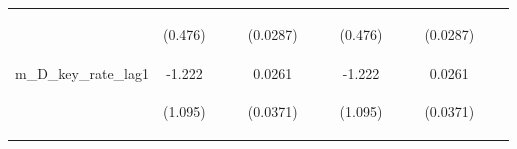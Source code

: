 \documentclass[]{article}
\begin{document}
\begin{center}
\begin{tabular}{lcccccccccccc}
\vspace{4pt} & \begin{footnotesize}(0.476)\end{footnotesize} & \begin{footnotesize}\end{footnotesize} & \begin{footnotesize}\end{footnotesize} & \begin{footnotesize}(0.0287)\end{footnotesize} & \begin{footnotesize}\end{footnotesize} & \begin{footnotesize}\end{footnotesize} & \begin{footnotesize}(0.476)\end{footnotesize} & \begin{footnotesize}\end{footnotesize} & \begin{footnotesize}\end{footnotesize} & \begin{footnotesize}(0.0287)\end{footnotesize} & \begin{footnotesize}\end{footnotesize} & \begin{footnotesize}\end{footnotesize} \\
m\_D\_key\_rate\_lag1 & -1.222 &  &  & 0.0261 &  &  & -1.222 &  &  & 0.0261 &  &  \\
\vspace{4pt} & \begin{footnotesize}(1.095)\end{footnotesize} & \begin{footnotesize}\end{footnotesize} & \begin{footnotesize}\end{footnotesize} & \begin{footnotesize}(0.0371)\end{footnotesize} & \begin{footnotesize}\end{footnotesize} & \begin{footnotesize}\end{footnotesize} & \begin{footnotesize}(1.095)\end{footnotesize} & \begin{footnotesize}\end{footnotesize} & \begin{footnotesize}\end{footnotesize} & \begin{footnotesize}(0.0371)\end{footnotesize} & \begin{footnotesize}\end{footnotesize} & \begin{footnotesize}\end{footnotesize} \\

\end{tabular}
\end{center}
\end{document}
